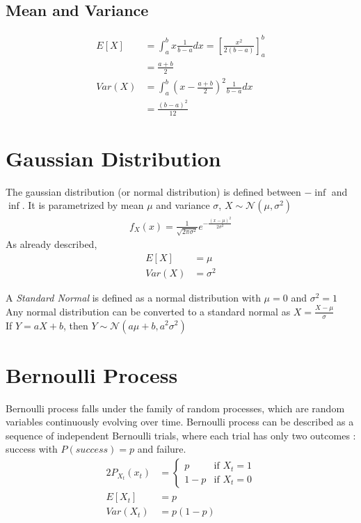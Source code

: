 \documentclass[../probability-notes.tex]{subfiles}
\begin{document}
    \subsection{Mean and Variance}
    \begin{align*}
        E[X] &= \int_{a}^{b} x \frac{1}{b-a} dx = [\frac{x^{2}}{2(b-a)}]_{a}^{b}\\
            &= \frac{a+b}{2}\\
        Var(X) &= \int_{a}^{b} (x - \frac{a+b}{2})^{2} \frac{1}{b-a} dx \\
            &= \frac{(b-a)^{2}}{12}
    \end{align*}

    \section{Gaussian Distribution}
    The gaussian distribution (or normal distribution) is defined between $-\inf$ and $\inf$. It is parametrized by mean $\mu$ and variance $\sigma$, $X \sim \mathcal{N}(\mu, \sigma^{2})$
    \begin{align*}
        f_{X}(x) = \frac{1}{\sqrt{2\pi \sigma^{2}}} e^{-\frac{(x-\mu)^{2}}{2 \sigma^{2}}}
    \end{align*}
    As already described,
    \begin{align*}
        E[X] &= \mu\\
        Var(X) &= \sigma^{2}
    \end{align*}

    A \emph{Standard Normal} is defined as a normal distribution with $\mu = 0$ and $\sigma^{2} = 1$\\
    Any normal distribution can be converted to a standard normal as $X = \frac{X - \mu}{\sigma}$\\
    If $Y = aX + b$, then $Y \sim \mathcal{N}(a \mu + b, a^{2}\sigma^{2})$

    \section{Bernoulli Process}
    Bernoulli process falls under the family of random processes, which are random variables continuously evolving over time. Bernoulli process can be described as a sequence of independent Bernoulli trials, where each trial has only two outcomes : success with $P(success) = p$ and failure.
    \begin{alignat*}{2}
        P_{X_{t}}(x_{t}) &= \begin{cases} p &\mbox{if $X_{t} = 1$}\\
                                        1-p &\mbox{if $X_{t} = 0$} \end{cases}\\
        E[X_{t}] &= p\\
        Var(X_{t}) &= p(1-p)
    \end{alignat*}
\end{document}
